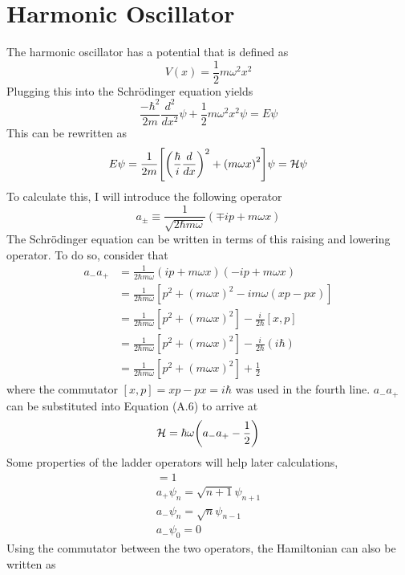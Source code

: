 \section{Harmonic Oscillator}
The harmonic oscillator has a potential that is defined as 
\begin{equation}
    V(x)=\frac{1}{2}m\omega^2 x^2
\end{equation}
Plugging this into the Schr\"odinger equation yields
\begin{equation}
    \frac{-\hbar^2}{2m}\frac{d^2}{dx^2}\psi+\frac{1}{2}m\omega^2 x^2\psi=E\psi
\end{equation}
This can be rewritten as 
\begin{equation}
    E\psi=\frac{1}{2m}\qty[\qty(\frac{\hbar}{i}\frac{d}{dx})^2+\qty(m\omega x)^2]\psi=\mathcal{H}\psi
\end{equation}
To calculate this, I will introduce the following operator
\begin{equation}
    a_{\pm}\equiv \frac{1}{\sqrt{2\hbar m \omega}} (\mp ip+m\omega x)
\end{equation}
The Schr\"odinger equation can be written in terms of this raising and lowering operator. To do so, consider that
\begin{align}
    a_-a_+&=\frac{1}{2\hbar m\omega} (ip+m\omega x)(-ip+m\omega x)\nonumber\\
    &=\frac{1}{2\hbar m\omega} [p^2+(m\omega x)^2-im\omega (xp-px)]\nonumber\\
    &=\frac{1}{2\hbar m\omega} [p^2+(m\omega x)^2]-\frac{i}{2\hbar}[x,p]\nonumber\\
    &=\frac{1}{2\hbar m\omega} [p^2+(m\omega x)^2]-\frac{i}{2\hbar}(i\hbar)\nonumber\\
    &=\frac{1}{2\hbar m\omega} [p^2+(m\omega x)^2]+\frac{1}{2}
\end{align}
where the commutator $[x,p]=xp-px=i\hbar$ was used in the fourth line. $a_-a_+$ can be substituted into Equation (A.6) to arrive at 
\begin{equation}
    \mathcal{H}=\hbar\omega\qty(a_-a_+-\frac{1}{2})
\end{equation}
Some properties of the ladder operators will help later calculations,
\begin{gather}
    [a_-,a_+]=1\\
    a_+\psi_n=\sqrt{n+1} \psi_{n+1}\\
    a_-\psi_n=\sqrt{n}\psi_{n-1}\\
    a_-\psi_0=0
\end{gather}
Using the commutator between the two operators, the Hamiltonian can also be written as 
